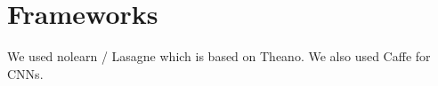 
\section{Frameworks}\label{sec:frameworks}
We used nolearn / Lasagne which is based on Theano\cite{Bergstra2010}. We
also used Caffe\cite{Jia2014} for \glspl{CNN}.
